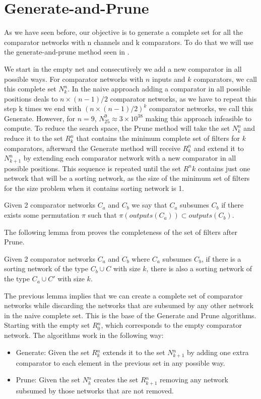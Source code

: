 \documentclass[../main.tex]{subfiles}
\begin{document}
	\section{Generate-and-Prune}
	As we have seen before, our objective is to generate a complete set for all the comparator networks with n channels and k comparators. To do that we will use the generate-and-prune method seen in \cite{sortingnineinputs}.
	
	 We start in the empty net and consecutively we add a new comparator in all possible ways. For comparator networks with $n$ inputs and $k$ comparators, we call this complete set $N^{n}_{k}$. In the naive approach adding a comparator in all possible positions deals to $n\times(n-1)/2$ comparator networks, as we have to repeat this step k times we end with $(n\times(n-1)/2)^k$ comparator networks, we call this Generate. However, for $n=9$, $N^{9}_{25}\approx 3\times10^{38}$ making this approach infeasible to compute. To reduce the search space, the Prune method will take the set $N^{n}_{k}$ and reduce it to the set $R^{n}_{k}$ that contains the minimum complete set of filters for $k$ comparators, afterward the Generate method will receive $R^{n}_{k}$ and extend it to $N^{n}_{k+1}$ by extending each comparator network with a new comparator in all possible positions. This sequence is repeated until the set $R^{n}{k}$ contains just one network that will be a sorting network, as the size of the minimum set of filters for the size problem when it contains sorting network is 1.
	
	\begin{definition}
		Given 2 comparator networks $C_a$ and $C_b$ we say that $C_a$ subsumes $C_b$ if there exists some permutation $\pi$ such that $\pi (outputs(C_a)) \subset outputs(C_b)$.
	\end{definition}

	The following lemma from \cite{sortingnineinputs} proves the completeness of the set of filters after Prune.
	
	\begin{lemma}
		Given 2 comparator networks $C_a$ and $C_b$ where $C_a$ subsumes $C_b$, if there is a sorting network of the type $C_b \cup C$ with size $k$, there is also a sorting network of the type $C_a \cup C'$ with size $k$.
	\end{lemma}
	
	The previous lemma implies that we can create a complete set of comparator networks while discarding the networks that are subsumed by any other network in the naive complete set. This is the base of the Generate and Prune algorithms. Starting with the empty set $R{^n_0}$, which corresponds to the empty comparator network. The algorithms work in the following way:
	
	\begin{itemize}
		\item Generate: Given the set $R{^n_k}$ extends it to the set $N{^n_{k+1}}$ by adding one extra comparator to each element in the previous set in any possible way.
		\item Prune: Given the set $N{^n_k}$ creates the set $R{^n_{k+1}}$ removing any network subsumed by those networks that are not removed.
	\end{itemize}
	\newpage
\end{document}
